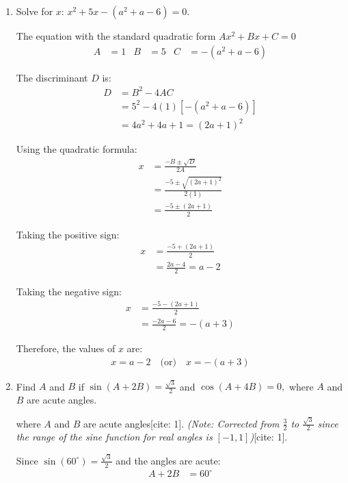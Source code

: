 \begin{enumerate}[label=\thesubsection.\arabic*, ref=\thesubsection.\theenumi]
	
	\item  Solve for $x$: $x^2+5x-(a^2+a-6)=0$.
	
	\solution
    The equation with the standard quadratic form $Ax^2 + Bx + C = 0$
	\begin{align*}
		A &= 1 & 	B &= 5  & 	C &= -(a^2 + a - 6)
	\end{align*}
	
	The discriminant $D$ is:
	\begin{align*}
		D &= B^2 - 4AC \\
		&= 5^2 - 4(1)\left[-(a^2 + a - 6)\right] \\
		&= 4a^2 + 4a + 1 = (2a + 1)^2
	\end{align*}
	
	Using the quadratic formula:
	\begin{align*}
		x &= \frac{-B \pm \sqrt{D}}{2A} \\
		&= \frac{-5 \pm \sqrt{(2a + 1)^2}}{2(1)} \\
		&= \frac{-5 \pm (2a + 1)}{2}
	\end{align*}
	
	Taking the positive sign:
	\begin{align*}
		x &= \frac{-5 + (2a + 1)}{2} \\
		&= \frac{2a - 4}{2} = a - 2
	\end{align*}
	
	Taking the negative sign:
	\begin{align*}
		x &= \frac{-5 - (2a + 1)}{2} \\
		&= \frac{-2a - 6}{2} = -(a + 3)
	\end{align*}
	
	Therefore, the values of $x$ are:
	\begin{align*}
		x = a - 2 \quad \text{(or)} \quad x = -(a + 3)
	\end{align*}
	
		
	\item  Find $A$ and $B$ if $\sin(A+2B)=\frac{\sqrt{3}}{2}$ and $\cos(A+4B)=0,$ where $A$ and $B$ are acute angles.
	
	\solution
	where $A$ and $B$ are acute angles[cite: 1]. \textit{(Note: Corrected from $\frac{3}{2}$ to $\frac{\sqrt{3}}{2}$ since the range of the sine function for real angles is $[-1, 1]$)}[cite: 1].
	
	\solution

	Since $\sin(60^\circ) = \frac{\sqrt{3}}{2}$ and the angles are acute:
	\begin{align*}
		A + 2B &= 60^\circ
	\end{align*}
	

\end{enumerate}
